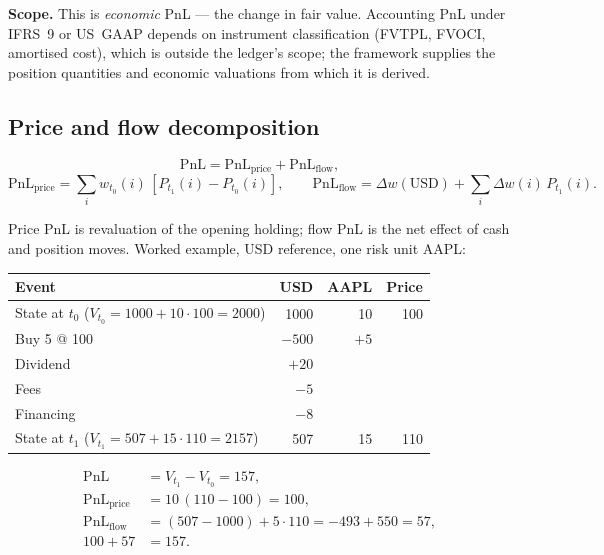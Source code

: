 \medskip
\noindent\textbf{Scope.} This is \emph{economic} PnL --- the change in fair value. Accounting PnL under IFRS~9 or US~GAAP depends on instrument classification (FVTPL, FVOCI, amortised cost), which is outside the ledger's scope; the framework supplies the position quantities and economic valuations from which it is derived.

\subsection{Price and flow decomposition}

\begin{proposition}
\label{prop:pnl-attribution}
\[
\mathrm{PnL} = \mathrm{PnL}_{\text{price}} + \mathrm{PnL}_{\text{flow}},
\]
\[
\mathrm{PnL}_{\text{price}} = \sum_i w_{t_0}(i)\,[P_{t_1}(i) - P_{t_0}(i)],
\qquad
\mathrm{PnL}_{\text{flow}} = \Delta w(\mathrm{USD}) + \sum_i \Delta w(i)\,P_{t_1}(i).
\]
\end{proposition}

\noindent Price PnL is revaluation of the opening holding; flow PnL is the net effect of cash and position moves. Worked example, USD reference, one risk unit AAPL:

\begin{center}
\begin{tabular}{l r r r}
\toprule
\textbf{Event} & \textbf{USD} & \textbf{AAPL} & \textbf{Price} \\
\midrule
State at $t_0$ \quad ($V_{t_0}=1000+10\cdot100=2000$) & 1000 & 10 & 100 \\
\midrule
Buy 5 @ 100 & $-500$ & $+5$ & \\
Dividend & $+20$ & & \\
Fees & $-5$ & & \\
Financing & $-8$ & & \\
\midrule
State at $t_1$ \quad ($V_{t_1}=507+15\cdot110=2157$) & 507 & 15 & 110 \\
\bottomrule
\end{tabular}
\end{center}

\begin{align*}
\mathrm{PnL} &= V_{t_1} - V_{t_0} = 157, \\
\mathrm{PnL}_{\text{price}} &= 10\,(110-100) = 100, \\
\mathrm{PnL}_{\text{flow}} &= (507-1000) + 5\cdot110 = -493 + 550 = 57, \\
100 + 57 &= 157.
\end{align*}

